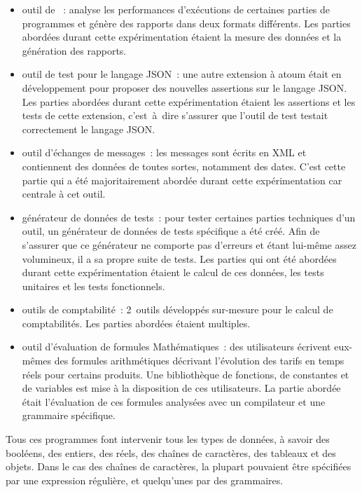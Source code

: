 \begin{itemize}

\item outil de ~: analyse les performances d'exécutions de
certaines parties de programmes et génère des rapports dans deux formats
différents. Les parties abordées durant cette expérimentation étaient la mesure
des données et la génération des rapports.

\item outil de test pour le langage JSON~: une autre extension à atoum était en
développement pour proposer des nouvelles assertions sur le langage JSON. Les
parties abordées durant cette expérimentation étaient les assertions et les
tests de cette extension, c'est~à~dire s'assurer que l'outil de test testait
correctement le langage JSON.

\item outil d'échanges de messages~: les messages sont écrits en XML et
contiennent des données de toutes sortes, notamment des dates. C'est cette
partie qui a été majoritairement abordée durant cette expérimentation car
centrale à cet outil.

\item générateur de données de tests~: pour tester certaines parties techniques
d'un outil, un générateur de données de tests spécifique a été créé. Afin de
s'assurer que ce générateur ne comporte pas d'erreurs et étant lui-même assez
volumineux, il a sa propre suite de tests. Les parties qui ont été abordées
durant cette expérimentation étaient le calcul de ces données, les tests
unitaires et les tests fonctionnels.

\item outils de comptabilité~: 2~outils développés sur-mesure pour le calcul de
comptabilités. Les parties abordées étaient multiples.

\item outil d'évaluation de formules Mathématiques~: des utilisateurs écrivent
eux-mêmes des formules arithmétiques décrivant l'évolution des tarifs en temps
réels pour certains produits. Une bibliothèque de fonctions, de constantes et de
variables est mise à la disposition de ces utilisateurs. La partie abordée était
l'évaluation de ces formules analysées avec un compilateur et une grammaire
spécifique.

\end{itemize}

Tous ces programmes font intervenir tous les types de données, à savoir des
booléens, des entiers, des réels, des chaînes de caractères, des tableaux et des
objets. Dans le cas des chaînes de caractères, la plupart pouvaient être
spécifiées par une expression régulière, et quelqu'unes par des grammaires.

